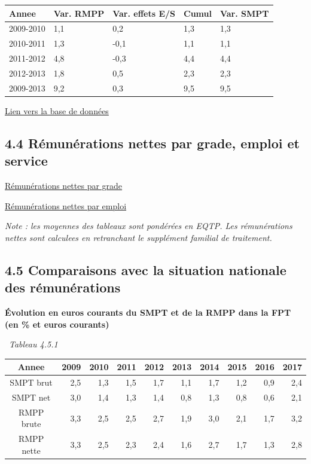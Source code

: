 \begin{longtable}[]{@{}lllll@{}}
\toprule
Annee & Var. RMPP & Var. effets E/S & Cumul & Var. SMPT\tabularnewline
\midrule
\endhead
2009-2010 & 1,1 & 0,2 & 1,3 & 1,3\tabularnewline
2010-2011 & 1,3 & -0,1 & 1,1 & 1,1\tabularnewline
2011-2012 & 4,8 & -0,3 & 4,4 & 4,4\tabularnewline
2012-2013 & 1,8 & 0,5 & 2,3 & 2,3\tabularnewline
2009-2013 & 9,2 & 0,3 & 9,5 & 9,5\tabularnewline
\bottomrule
\end{longtable}

\href{../Bases/Remunerations/Anavar.synthese.csv}{Lien vers la base de
données}

\hypertarget{remunerations-nettes-par-grade-emploi-et-service}{%
\subsection{4.4 Rémunérations nettes par grade, emploi et
service}\label{remunerations-nettes-par-grade-emploi-et-service}}

\href{../Bases/Remunerations/net.grades.csv}{Rémunérations nettes par
grade}

\href{../Bases/Remunerations/net.emplois.csv}{Rémunérations nettes par
emploi}

\emph{Note : les moyennes des tableaux sont pondérées en EQTP. Les
rémunérations nettes sont calculees en retranchant le supplément
familial de traitement.}

\hypertarget{comparaisons-avec-la-situation-nationale-des-remunerations}{%
\subsection{4.5 Comparaisons avec la situation nationale des
rémunérations}\label{comparaisons-avec-la-situation-nationale-des-remunerations}}

\textbf{Évolution en euros courants du SMPT et de la RMPP dans la FPT
(en \% et euros courants)}

~\emph{Tableau 4.5.1}

\begin{longtable}[]{@{}crrrrrrrrr@{}}
\toprule
Annee & 2009 & 2010 & 2011 & 2012 & 2013 & 2014 & 2015 & 2016 &
2017\tabularnewline
\midrule
\endhead
SMPT brut & 2,5 & 1,3 & 1,5 & 1,7 & 1,1 & 1,7 & 1,2 & 0,9 &
2,4\tabularnewline
SMPT net & 3,0 & 1,4 & 1,3 & 1,4 & 0,8 & 1,3 & 0,8 & 0,6 &
2,1\tabularnewline
RMPP brute & 3,3 & 2,5 & 2,5 & 2,7 & 1,9 & 3,0 & 2,1 & 1,7 &
3,2\tabularnewline
RMPP nette & 3,3 & 2,5 & 2,3 & 2,4 & 1,6 & 2,7 & 1,7 & 1,3 &
2,8\tabularnewline
\bottomrule
\end{longtable}

